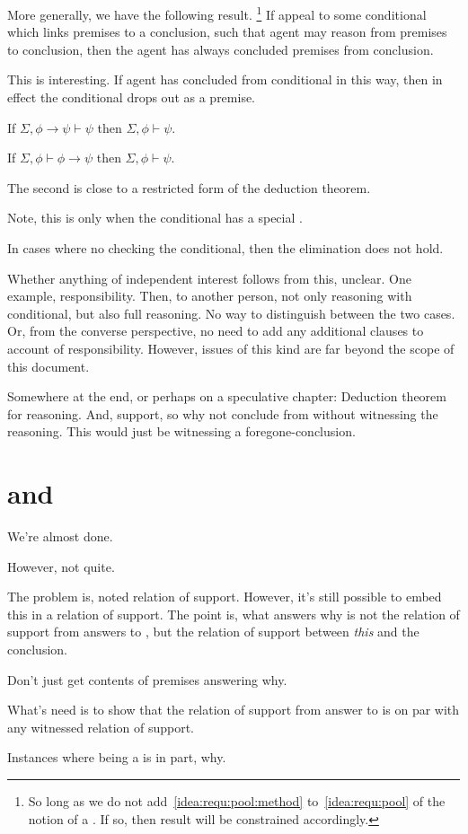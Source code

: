 \begin{note}
  More generally, we have the following result.%
  \footnote{
    So long as we do not add~\autoref{idea:requ:pool:method} to~\autoref{idea:requ:pool} of the notion of a \requ{}.
    If so, then result will be constrained accordingly.
  }
  If appeal to some conditional which links premises to a conclusion, such that agent may reason from premises to conclusion, then the agent has always concluded premises from conclusion.

  This is interesting.
  If agent has concluded from conditional in this way, then in effect the conditional drops out as a premise.

  If \(\Sigma, \phi \rightarrow \psi \vdash \psi\) then \(\Sigma, \phi \vdash \psi\).

  If \(\Sigma, \phi \vdash \phi \rightarrow \psi\) then \(\Sigma, \phi \vdash \psi\).

  The second is close to a restricted form of the deduction theorem.

  Note, this is only when the conditional has a special \requ{}.

  In cases where no checking the conditional, then the elimination does not hold.

  Whether anything of independent interest follows from this, unclear.
  One example, responsibility.
  Then, to another person, not only reasoning with conditional, but also full reasoning.
  No way to distinguish between the two cases.
  Or, from the converse perspective, no need to add any additional clauses to account of responsibility.
  However, issues of this kind are far beyond the scope of this document.
\end{note}


\begin{note}
  Somewhere at the end, or perhaps on a speculative chapter:
  Deduction theorem for reasoning.
  And, support, so why not conclude from without witnessing the reasoning.
  This would just be witnessing a foregone-conclusion.
\end{note}

\chapter{ and \qWhy{}}
\label{cha:fc-why}

\begin{note}
  We're almost done.

  However, not quite.

  The problem is, noted relation of support.
  However, it's still possible to embed this in a relation of support.
  The point is, what answers why is not the relation of support from answers to \qzS{}, but the relation of support between \emph{this} and the conclusion.

  Don't just get contents of premises answering why.

  What's need is to show that the relation of support from answer to \qzS{} is on par with any witnessed relation of support.

  Instances where being a \fc{} is in part, why.
\end{note}

